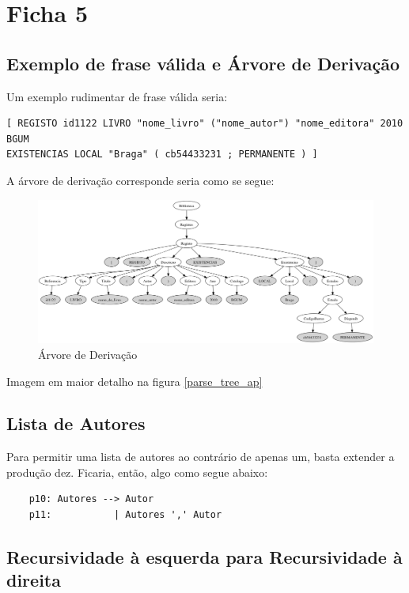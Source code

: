 \documentclass[a4paper,11pt,openright,openbib]{article}
\begin{document}
\section{Ficha 5} %
\label{sec:ficha_5}

\subsection{Exemplo de frase válida e Árvore de Derivação}

Um exemplo rudimentar de frase válida seria: 
\begin{verbatim}
[ REGISTO id1122 LIVRO "nome_livro" ("nome_autor") "nome_editora" 2010 BGUM 
EXISTENCIAS LOCAL "Braga" ( cb54433231 ; PERMANENTE ) ]
\end{verbatim}

A árvore de derivação corresponde seria como se segue:

\begin{figure}[!htb]
	\begin{center}
		\includegraphics[width=\textwidth,keepaspectratio]{../ficha5/g.png}
	\end{center}	
	\caption{\label{parse_tree}Árvore de Derivação}
\end{figure}

\small{Imagem em maior detalho na figura \ref{parse_tree_ap}}

\subsection{Lista de Autores}
Para permitir uma lista de autores ao contrário de apenas um, basta extender a produção dez.
Ficaria, então, algo como segue abaixo:

\begin{verbatim}
	p10: Autores --> Autor
	p11:           | Autores ',' Autor
\end{verbatim}

\subsection{Recursividade à esquerda para Recursividade à direita}
\end{document}
